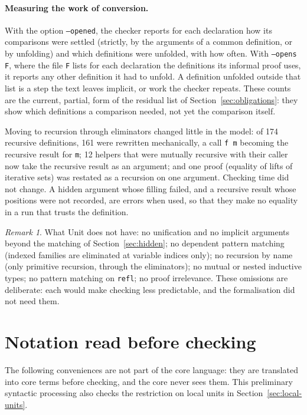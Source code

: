 \documentclass[11pt]{article}
\newcommand{\sys}{\textsf{Unit}\xspace}
\newcommand{\kw}[1]{\texttt{#1}}
\theoremstyle{remark}
\newtheorem{remark}{Remark}
\begin{document}
\paragraph{Measuring the work of conversion.} With the option
\kw{--opened}, the checker reports for each declaration how its
comparisons were settled (strictly, by the arguments of a common
definition, or by unfolding) and which definitions were unfolded, with
how often. With \kw{--opens F}, where the file \kw{F} lists for each
declaration the definitions its informal proof uses, it reports any
other definition it had to unfold. A definition unfolded outside that
list is a step the text leaves implicit, or work the checker repeats.
These counts are the current, partial, form of the residual list of
Section~\ref{sec:obligations}: they show which definitions a comparison
needed, not yet the comparison itself.

Moving to recursion through eliminators changed little in the model: of
174 recursive definitions, 161 were rewritten mechanically, a call
\kw{f m} becoming the recursive result for \kw{m}; 12 helpers that were
mutually recursive with their caller now take the recursive result as an
argument; and one proof (equality of lifts of iterative sets) was
restated as a recursion on one argument. Checking time did not change.
A hidden argument whose filling failed, and a recursive result whose
positions were not recorded, are errors when used, so that they make no
equality in a run that trusts the definition.

\begin{remark}
What \sys does not have: no unification and no implicit arguments beyond
the matching of Section~\ref{sec:hidden}; no dependent pattern matching
(indexed families are eliminated at variable indices only);
no recursion by name (only primitive recursion, through the
eliminators); no mutual or nested inductive types;
no pattern matching on \kw{refl}; no
proof irrelevance. These omissions are deliberate: each would make
checking less predictable, and the formalisation did not need them.
\end{remark}

\section{Notation read before checking}\label{sec:notation}

The following conveniences are not part of the core language: they are
translated into core terms before checking, and the core never sees them.
This preliminary syntactic processing also checks the restriction on
local units in Section~\ref{sec:local-units}.
\end{document}
